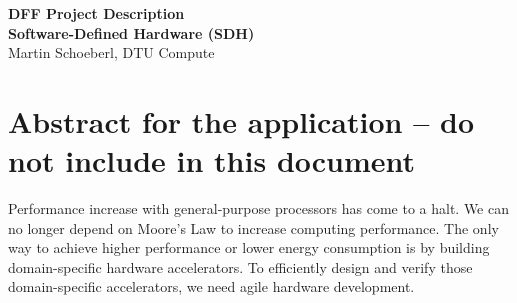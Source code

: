 \documentclass[fleqn,12pt]{article}
\begin{document}
\setlength{\baselineskip}{1.44\baselineskip}


\begin{center}
  {\LARGE\bf DFF Project Description }\\[1ex]
  {\LARGE\bf Software-Defined Hardware (SDH)}\\[1ex]
  {\large Martin Schoeberl, DTU Compute}\\[1ex]
 \end{center}


%


\section{Abstract for the application -- do not include in this document}
%
Performance increase with general-purpose processors has come to a halt. We can no longer depend on Moore's Law to increase computing performance. The only way to achieve higher performance or lower energy consumption is by building domain-specific hardware accelerators. To efficiently design and verify those domain-specific accelerators, we need agile hardware development.
\end{document}
